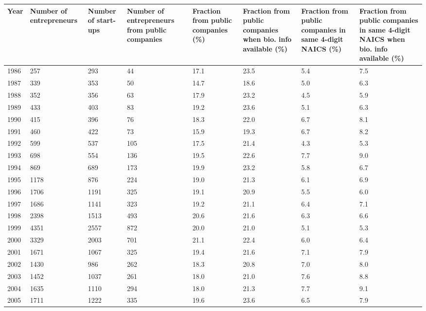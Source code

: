 \begin{table}[ht]
\centering
\begingroup\footnotesize
\begin{tabular}{p{1.75cm}p{1.75cm}p{1.75cm}p{1.75cm}p{1.75cm}p{1.75cm}p{1.75cm}p{1.75cm}}
  \toprule
Year & Number of entrepreneurs & Number of start-ups & Number of entrepreneurs from public companies & Fraction from public companies (\%) & Fraction from public companies when bio. info available (\%) & Fraction from public companies in same 4-digit NAICS (\%) & Fraction from public companies in same 4-digit NAICS when bio. info available (\%) \\ 
  \midrule
1986 & 257 & 293 & 44 & 17.1 & 23.5 & 5.4 & 7.5 \\ 
  1987 & 339 & 353 & 50 & 14.7 & 18.6 & 5.0 & 6.3 \\ 
  1988 & 352 & 356 & 63 & 17.9 & 23.2 & 4.5 & 5.9 \\ 
  1989 & 433 & 403 & 83 & 19.2 & 23.6 & 5.1 & 6.3 \\ 
  1990 & 415 & 396 & 76 & 18.3 & 22.0 & 6.7 & 8.1 \\ 
  1991 & 460 & 422 & 73 & 15.9 & 19.3 & 6.7 & 8.2 \\ 
  1992 & 599 & 537 & 105 & 17.5 & 21.4 & 4.3 & 5.3 \\ 
  1993 & 698 & 554 & 136 & 19.5 & 22.6 & 7.7 & 9.0 \\ 
  1994 & 869 & 689 & 173 & 19.9 & 23.2 & 5.8 & 6.7 \\ 
  1995 & 1178 & 876 & 224 & 19.0 & 21.3 & 6.1 & 6.9 \\ 
  1996 & 1706 & 1191 & 325 & 19.1 & 20.9 & 5.5 & 6.0 \\ 
  1997 & 1686 & 1141 & 323 & 19.2 & 21.1 & 6.4 & 7.1 \\ 
  1998 & 2398 & 1513 & 493 & 20.6 & 21.6 & 6.3 & 6.6 \\ 
  1999 & 4351 & 2557 & 872 & 20.0 & 21.0 & 5.1 & 5.3 \\ 
  2000 & 3329 & 2003 & 701 & 21.1 & 22.4 & 6.0 & 6.4 \\ 
  2001 & 1671 & 1067 & 325 & 19.4 & 21.6 & 7.1 & 7.9 \\ 
  2002 & 1430 & 986 & 262 & 18.3 & 20.8 & 7.0 & 8.0 \\ 
  2003 & 1452 & 1037 & 261 & 18.0 & 21.0 & 7.6 & 8.8 \\ 
  2004 & 1635 & 1110 & 294 & 18.0 & 21.3 & 7.7 & 9.1 \\ 
  2005 & 1711 & 1222 & 335 & 19.6 & 23.6 & 6.5 & 7.9 \\ 

\end{tabular}
\end{table}
